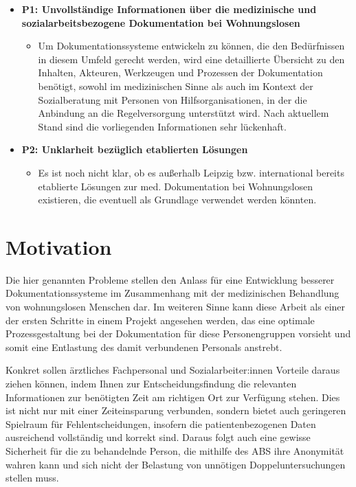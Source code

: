 \begin{itemize}
\item \textbf{P1: Unvollständige Informationen über die medizinische und sozialarbeitsbezogene Dokumentation bei Wohnungslosen}
	\begin{itemize}
		\item[] Um Dokumentationssysteme entwickeln zu können, die den Bedürfnissen in diesem Umfeld gerecht werden, wird eine detaillierte Übersicht zu den Inhalten, Akteuren, Werkzeugen und Prozessen der Dokumentation benötigt, sowohl im medizinischen Sinne als auch im Kontext der Sozialberatung mit Personen von Hilfsorganisationen, in der die Anbindung an die Regelversorgung unterstützt wird. Nach aktuellem Stand sind die vorliegenden Informationen sehr lückenhaft.
	\end{itemize}
\item \textbf{P2: Unklarheit bezüglich etablierten Lösungen}
	\begin{itemize}
		\item[] Es ist noch nicht klar, ob es außerhalb Leipzig bzw. international bereits etablierte Lösungen zur med. Dokumentation bei Wohnungslosen existieren, die eventuell als Grundlage verwendet werden könnten.
	\end{itemize}
\end{itemize}


\section{Motivation}

Die hier genannten Probleme stellen den Anlass für eine Entwicklung besserer Dokumentationssysteme im Zusammenhang mit der medizinischen Behandlung von wohnungslosen Menschen dar. Im weiteren Sinne kann diese Arbeit als einer der ersten Schritte in einem Projekt angesehen werden, das eine optimale Prozessgestaltung bei der Dokumentation für diese Personengruppen vorsieht und somit eine Entlastung des damit verbundenen Personals anstrebt.

Konkret sollen ärztliches Fachpersonal und Sozialarbeiter:innen Vorteile daraus ziehen können, indem Ihnen zur Entscheidungsfindung die relevanten Informationen zur benötigten Zeit am richtigen Ort zur Verfügung stehen. Dies ist nicht nur mit einer Zeiteinsparung verbunden, sondern bietet auch geringeren Spielraum für Fehlentscheidungen, insofern die patientenbezogenen Daten ausreichend vollständig und korrekt sind. Daraus folgt auch eine gewisse Sicherheit für die zu behandelnde Person, die mithilfe des ABS ihre Anonymität wahren kann und sich nicht der Belastung von unnötigen Doppeluntersuchungen stellen muss.

